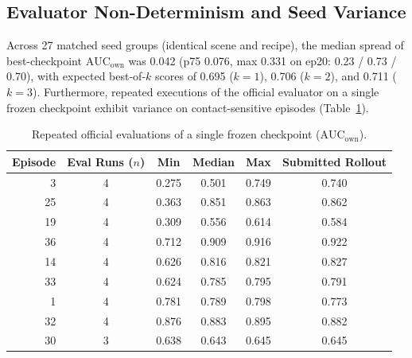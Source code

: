 \documentclass[10pt]{nvidiaextabstract}
\newcommand{\ownauc}{\ensuremath{\mathrm{AUC}_{\text{own}}}\xspace}
\begin{document}
\begin{table}[t]
  \centering\small
  \setlength{\tabcolsep}{5pt}
  \caption{Summary of FlashSAC policy training recipes.}
  \label{tab:recipes}
\end{table}

\subsection{Evaluator Non-Determinism and Seed Variance}
Across 27 matched seed groups (identical scene and recipe), the median spread of best-checkpoint $\ownauc$ was 0.042 (p75 0.076, max 0.331 on ep20: 0.23 / 0.73 / 0.70), with expected best-of-$k$ scores of 0.695 ($k=1$), 0.706 ($k=2$), and 0.711 ($k=3$). Furthermore, repeated executions of the official evaluator on a single frozen checkpoint exhibit variance on contact-sensitive episodes (Table~\ref{tab:rescore}).

\begin{table}[t]
  \centering\small
  \begin{tabular}{@{}rccccc@{}}
    \toprule
    \textbf{Episode} & \textbf{Eval Runs ($n$)} & \textbf{Min} & \textbf{Median} & \textbf{Max} & \textbf{Submitted Rollout} \\
    \midrule
    3  & 4 & 0.275 & 0.501 & 0.749 & 0.740 \\
    25 & 4 & 0.363 & 0.851 & 0.863 & 0.862 \\
    19 & 4 & 0.309 & 0.556 & 0.614 & 0.584 \\
    36 & 4 & 0.712 & 0.909 & 0.916 & 0.922 \\
    14 & 4 & 0.626 & 0.816 & 0.821 & 0.827 \\
    33 & 4 & 0.624 & 0.785 & 0.795 & 0.791 \\
    1  & 4 & 0.781 & 0.789 & 0.798 & 0.773 \\
    32 & 4 & 0.876 & 0.883 & 0.895 & 0.882 \\
    30 & 3 & 0.638 & 0.643 & 0.645 & 0.645 \\
    \bottomrule
  \end{tabular}
  \caption{Repeated official evaluations of a single frozen checkpoint ($\ownauc$).}
  \label{tab:rescore}
\end{table}
\end{document}
